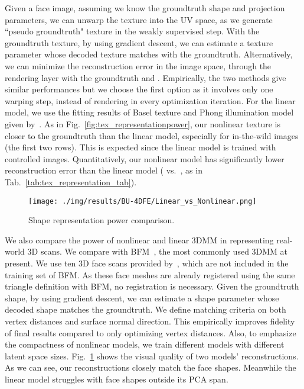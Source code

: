 Given a face image, assuming we know the groundtruth shape and projection parameters, we can unwarp the texture into the UV space, as we generate ``pseudo groundtruth" texture in the weakly supervised step. 
With the groundtruth texture, by using gradient descent, we can estimate a texture parameter   whose decoded texture matches with the groundtruth. 
Alternatively, we can minimize the reconstruction error in the image space, through the rendering layer with the groundtruth  and . 
Empirically, the two methods give similar performances but we choose the first option as it involves only one warping step, instead of rendering in every optimization iteration.
For the linear model, we use the fitting results of Basel texture and Phong illumination model~\cite{phong1975illumination} given by~\cite{zhu2016face}. 
As in Fig.~\ref{fig:tex_representationpower}, our nonlinear texture is closer to the groundtruth than the linear model, especially for in-the-wild images (the first two rows).
This is expected since the linear model is trained with controlled images. 
Quantitatively, our nonlinear model has significantly lower  reconstruction error than the linear model ( vs.~, as in Tab.~\ref{tab:tex_representation_tab}).


\begin{figure}[t!]
\begin{center}
\small
\texttt{[image: ./img/results/BU-4DFE/Linear\_vs\_Nonlinear.png]}
\figvspace\vspace{1mm}
\caption{\small Shape representation power comparison.}
\label{fig:shape_representation}\figvspace
\end{center}
\end{figure}



We also compare the power of nonlinear and linear 3DMM in representing real-world 3D scans. 
We compare with BFM~\cite{paysan20093d}, the most commonly used 3DMM at present. 
We use ten 3D face scans provided by~\cite{paysan20093d}, which are not included in the training set of BFM.
As these face meshes are already registered using the same triangle definition with BFM,  no registration is necessary.
Given the groundtruth shape, by using gradient descent, we can estimate a shape parameter whose decoded shape matches the groundtruth. 
We define matching criteria on both vertex distances and surface normal direction. 
This empirically improves fidelity of final results compared to only optimizing vertex distances.
Also, to emphasize the compactness of nonlinear models, we train different models with different latent space sizes.
Fig.~\ref{fig:shape_representation} shows the visual quality of two models' reconstructions.
As we can see, our reconstructions closely match the face shapes. 
Meanwhile the linear model struggles with face shapes outside its PCA span.

